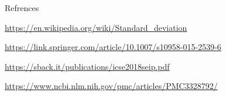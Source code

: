 \documentclass[final]{beamer}
\newlength{\onecolwid}
\begin{document}
\begin{frame}[t]
\begin{columns}[t]
\begin{column}{\onecolwid}

\begin{block}{Refrences}

\begin{thebibliography}{9}
\url{https://en.wikipedia.org/wiki/Standard_deviation}
 
\url{https://link.springer.com/article/10.1007/s10958-015-2539-6}

 
\url{https://sback.it/publications/icse2018seip.pdf}


\url{https://www.ncbi.nlm.nih.gov/pmc/articles/PMC3328792/}
\end{thebibliography}



\end{block}






\end{column} %

\end{columns} %

\end{frame} %
\end{document}
